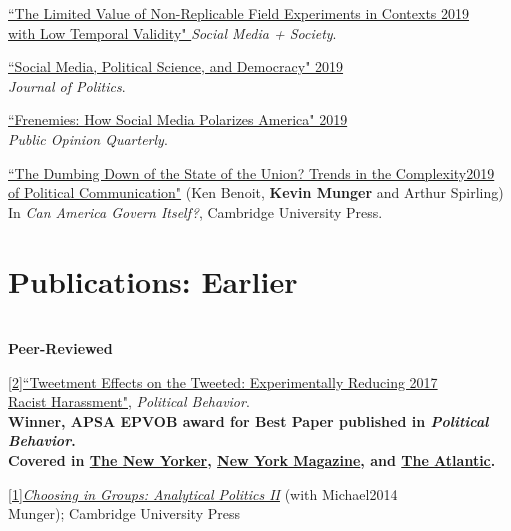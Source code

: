 \documentclass[margin]{res}
\begin{document}
{\href{https://journals.sagepub.com/doi/full/10.1177/2056305119859294}{``The Limited Value of Non-Replicable Field Experiments in Contexts \hfill 2019\\ with Low Temporal Validity" } \textit{Social Media + Society}.

\href{https://www.journals.uchicago.edu/doi/abs/10.1086/703490?journalCode=jop}{ ``Social Media, Political Science, and Democracy" \hfill 2019}\\ \textit{Journal of Politics}.

\href{https://academic.oup.com/poq/article/83/3/643/5566314?casa_token=O2eAWTsKfeMAAAAA:86eyXM30u3vZeEXRluBIBLrjzuyBRfPoml9PPNIbt8V_2h0Jk1_iuSnoiPJAku6DDEf0T5Rjjzkv}{``Frenemies: How Social Media Polarizes America" \hfill 2019}\\ \textit{Public Opinion Quarterly}.



\href{http://kmunger.github.io/pdfs/BenoitMungerSpirling_SSRCchapter.pdf}{``The Dumbing Down of the State of the Union? Trends in the Complexity\hfill 2019 \\of Political Communication"} (Ken Benoit, \textbf{Kevin Munger} and Arthur Spirling)\\ In \textit{Can America Govern Itself?}, Cambridge University Press.	

\section{Publications: Earlier} 
\hfill \\
\textbf{Peer-Reviewed}


\href{http://dx.doi.org/10.1007/s11109-016-9373-5}{[2]``Tweetment Effects on the Tweeted: Experimentally Reducing \hfill 2017  \\Racist Harassment"}, \textit{Political Behavior}.\\
\footnotesize{\textbf{Winner, APSA EPVOB award for Best Paper published in \textit{Political Behavior}.}}\\
\footnotesize{\textbf{Covered in \href{https://www.newyorker.com/science/maria-konnikova/how-norms-change}{The New Yorker}, \href{https://www.thecut.com/2016/11/telling-people-to-be-less-racist-online-works-sometimes.html}{New York Magazine}, and 
\href{https://www.theatlantic.com/technology/archive/2016/11/why-online-allies-matter-in-fighting-harassment/507722/}{The Atlantic}.}}

\normalsize


\href{https://books.google.com/books?hl=en&lr=&id=DjDCBQAAQBAJ&oi=fnd&pg=PR8&dq=info:wJNj4s4SSScJ:scholar.google.com&ots=glPhyrKFJm&sig=-L5i6lXJViyJU9ynCW7UL66SV-I#v=onepage&q&f=false}{[1]\emph{Choosing in Groups: Analytical Politics II}} (with Michael\hfill 2014\\ Munger); Cambridge University Press 



}
\end{document}
